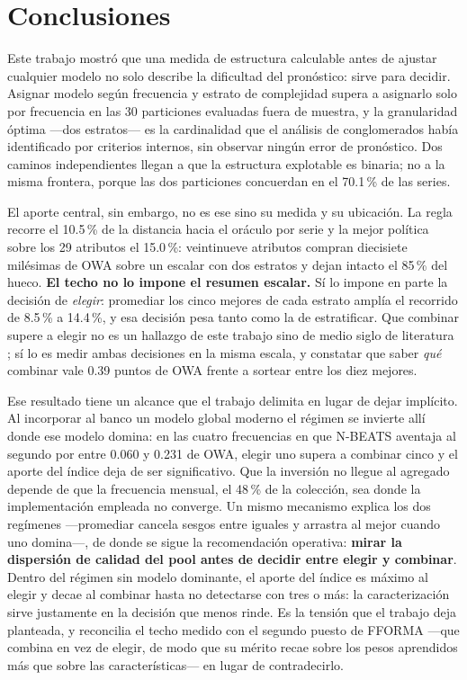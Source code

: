 \section{Conclusiones}\label{sec:conclusiones}

Este trabajo mostró que una medida de estructura calculable antes de ajustar cualquier
modelo no solo describe la dificultad del pronóstico: sirve para decidir. Asignar modelo
según frecuencia y estrato de complejidad supera a asignarlo solo por frecuencia en las 30
particiones evaluadas fuera de muestra, y la granularidad óptima ---dos estratos--- es la
cardinalidad que el análisis de conglomerados había identificado por criterios internos,
sin observar ningún error de pronóstico. Dos caminos independientes llegan a que la
estructura explotable es binaria; no a la misma frontera, porque las dos particiones
concuerdan en el 70.1\,\% de las series.

El aporte central, sin embargo, no es ese sino su medida y su ubicación. La regla recorre
el 10.5\,\% de la distancia hacia el oráculo por serie y la mejor política sobre los 29
atributos el 15.0\,\%: veintinueve atributos compran diecisiete milésimas de OWA sobre un
escalar con dos estratos y dejan intacto el 85\,\% del hueco. \textbf{El techo no lo impone
el resumen escalar.} Sí lo impone en parte la decisión de \emph{elegir}: promediar los
cinco mejores de cada estrato amplía el recorrido de 8.5\,\% a 14.4\,\%, y esa decisión
pesa tanto como la de estratificar. Que combinar supere a elegir no es un hallazgo de este
trabajo sino de medio siglo de literatura \cite{bates1969,wang2023}; sí lo es medir ambas
decisiones en la misma escala, y constatar que saber \emph{qué} combinar vale 0.39 puntos
de OWA frente a sortear entre los diez mejores.

Ese resultado tiene un alcance que el trabajo delimita en lugar de dejar implícito. Al
incorporar al banco un modelo global moderno el régimen se invierte allí donde ese modelo
domina: en las cuatro frecuencias en que N-BEATS aventaja al segundo por entre 0.060 y
0.231 de OWA, elegir uno supera a combinar cinco y el aporte del índice deja de ser
significativo. Que la inversión no llegue al agregado depende de que la frecuencia
mensual, el 48\,\% de la colección, sea donde la implementación empleada no converge. Un
mismo mecanismo explica los dos regímenes ---promediar cancela sesgos entre iguales y
arrastra al mejor cuando uno domina---, de donde se sigue la recomendación operativa:
\textbf{mirar la dispersión de calidad del pool antes de decidir entre elegir y combinar}.
Dentro del régimen sin modelo dominante, el aporte del índice es máximo al elegir y decae
al combinar hasta no detectarse con tres o más: la caracterización sirve justamente en la
decisión que menos rinde. Es la tensión que el trabajo deja planteada, y reconcilia el
techo medido con el segundo puesto de FFORMA ---que combina en vez de elegir, de modo que
su mérito recae sobre los pesos aprendidos más que sobre las características--- en lugar
de contradecirlo.

